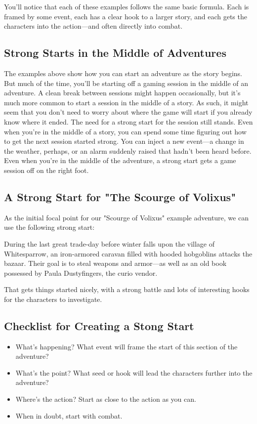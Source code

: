 \documentclass[10pt,a4paper,twoside,bg=print,twocolumn,openany,nodeprecatedcode]{dndbook}
\begin{document}
You'll notice that each of these examples follows the same basic formula. Each is framed by some event, each has a clear hook to a larger story, and each gets the characters into the action—and often directly into combat.
\subsection{Strong Starts in the Middle of Adventures}
The examples above show how you can start an adventure as the story begins. But much of the time, you'll be starting off a gaming session in the middle of an adventure. A clean break between sessions might happen occasionally, but it's much more common to start a session in the middle of a story. As such, it might seem that you don't need to worry about where the game will start if you already know where it ended.
The need for a strong start for the session still stands. Even when you're in the middle of a story, you can spend some time figuring out how to get the next session started strong. You can inject a new event—a change in the weather, perhaps, or an alarm suddenly raised that hadn't been heard before. Even when you're in the middle of the adventure, a strong start gets a game session off on the right foot.
\subsection{A Strong Start for "The Scourge of Volixus"}
As the initial focal point for our "Scourge of Volixus" example adventure, we can use the following strong start:
\begin{DndSidebar}[float=!b]{}
During the last great trade-day before winter falls upon the village of Whitesparrow, an iron-armored caravan filled with hooded hobgoblins attacks the bazaar. Their goal is to steal weapons and armor—as well as an old book possessed by Paula Dustyfingers, the curio vendor.


\end{DndSidebar}

That gets things started nicely, with a strong battle and lots of interesting hooks for the characters to investigate.
\subsection{Checklist for Creating a Stong Start}

\begin{itemize}
\item What's happening? What event will frame the start of this section of the adventure?
\item What's the point? What seed or hook will lead the characters further into the adventure?
\item Where's the action? Start as close to the action as you can.
\item When in doubt, start with combat.
\end{itemize}
\end{document}
